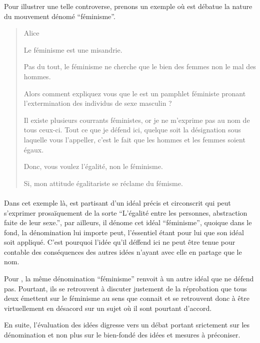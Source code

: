 Pour illustrer une telle controverse, prenons un exemple où est débatue la nature du mouvement dénomé \enquote{féminisme}.



\begin{quote}
  \begin{drama}{0cm}{0cm}{Alice}

    \Aspeaks Le féminisme est une misandrie.

    \Bspeaks Pas du tout, le féminisme ne cherche que le bien des femmes non le mal des hommes.

    \Aspeaks Alors comment expliquez vous que le  est un pamphlet féministe pronant l’extermination des individus de sexe masculin ?

    \Bspeaks Il existe plusieurs courrants féministes, or je ne m’exprime pas au nom de tous ceux-ci. Tout ce que je défend ici, quelque soit la désignation sous laquelle vous l’appeller, c’est le fait que les hommes et les femmes soient égaux.

    \Aspeaks Donc, vous voulez l’égalité, non le féminisme.

    \Bspeaks Si, mon attitude égalitariste se réclame du fémisme.

  \end{drama}
\end{quote}

\paragraph{}
Dans cet exemple là, \B est partisant d’un idéal précis et circonscrit qui peut s’exprimer prosaïquement de la sorte \enquote{L’égalité entre les personnes, abstraction faite de leur sexe.}, par ailleurs, il dénome cet idéal \enquote{féminisme}, quoique dans le fond, la dénomination lui importe peut, l’éssentiel étant pour lui que son idéal soit appliqué.
C’est pourquoi l’idée qu’il déffend ici ne peut être tenue pour contable des conséquences des autres idées n’ayant avec elle en partage que le nom.

Pour \A, la même dénomination \enquote{féminisme} renvoit à un autre idéal que \B ne défend pas. Pourtant, ils se retrouvent à discuter justement de la réprobation que tous deux émettent sur le féminisme au sens que connait \A et se retrouvent donc à être virtuellement en désacord sur un sujet où il sont pourtant d’accord.

En suite, l’évaluation des idées digresse vers un débat portant srictement sur les dénomination et non plus sur le bien-fondé des idées et mesures à préconiser.


